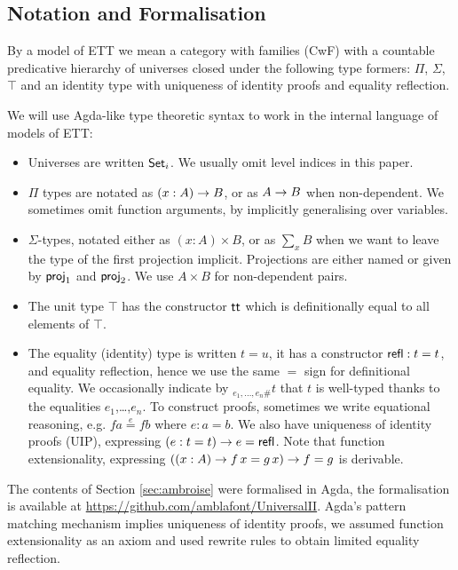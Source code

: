 \documentclass[a4paper,UKenglish,cleveref, autoref]{lipics-v2019}
\begin{document}
\subsection{Notation and Formalisation}
\label{sec:notation}

\begin{definition}\label{def:ett}
  By a model of ETT we mean a category with families (CwF)
  \cite{Dybjer96internaltype,Hofmann97syntaxand} with a countable
  predicative hierarchy of universes closed under the following type
  formers: $\Pi$, $\Sigma$, $\top$ and an identity type with
  uniqueness of identity proofs and equality reflection.
\end{definition}

We will use Agda-like type theoretic syntax to work in the internal
language of models of ETT:
\begin{itemize}
\item Universes are written $\Set_i$. We usually omit level indices in this paper.
\item $\Pi$ types are notated as $(x : A)\ra B$, or as $A \ra B$ when
  non-dependent. We sometimes omit function arguments, by implicitly
  generalising over variables.
\item $\Sigma$-types, notated either as $(x : A)\times B$, or as
  $\sum\limits_{x} B$ when we want to leave the type of the first
  projection implicit. Projections are either named or given by
  $\proj_1$ and $\proj_2$. We use $A \times B$ for non-dependent
  pairs.
\item The unit type $\top$ has the constructor $\tt$ which is
  definitionally equal to all elements of $\top$.
\item The equality (identity) type is written $t = u$, it has a
  constructor $\refl : t = t$, and equality reflection, hence we use
  the same $=$ sign for definitional equality. We occasionally
  indicate by $_{e_1,\dots,e_n \#}t$ that $t$ is well-typed thanks to
  the equalities $e_1$,\dots,$e_n$. To construct proofs, sometimes we
  write equational reasoning, e.g. $f a \overset{e}{=} f b$ where
  $e : a = b$. We also have uniqueness of identity proofs (UIP),
  expressing $(e : t = t)\ra e = \refl$. Note that function
  extensionality, expressing $((x : A) \ra f\,x = g\,x) \ra f = g$ is
  derivable.
\end{itemize}

The contents of Section \ref{sec:ambroise} were formalised in Agda,
the formalisation is available at
\url{https://github.com/amblafont/UniversalII}. Agda's pattern
matching mechanism implies uniqueness of identity proofs, we assumed
function extensionality as an axiom and used rewrite rules
\cite{cockxsprinkles} to obtain limited equality reflection.
\end{document}
